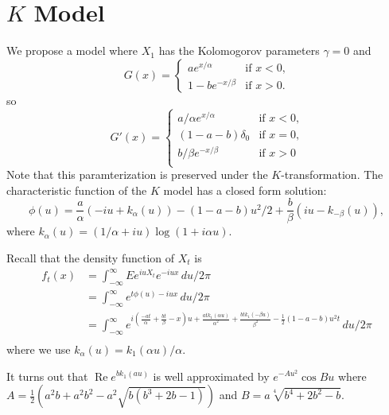 \documentclass[fleqn]{amsart}
\renewcommand{\Re}{\mathop{\mathrm{Re}}}
\begin{document}
\section{\(K\) Model}
We propose a model where \(X_1\) has the Kolomogorov parameters
\(\gamma = 0\) and 
\begin{equation*}
G(x) =
\begin{cases}
ae^{x/\alpha} & \text{if $x < 0$,}\\
1 - be^{-x/\beta} & \text{if $x > 0$.}
\end{cases}
\end{equation*}
so
\begin{equation*}
G'(x) =
\begin{cases}
a/\alpha e^{x/\alpha} & \text{if $x < 0$,}\\
(1 - a - b)\delta_0 & \text{if $x = 0$,}\\
b/\beta e^{-x/\beta} & \text{if $x > 0$}\\
\end{cases}
\end{equation*}
Note that this paramterization is preserved under the
\(K\)-transformation.
The characteristic function
of the \(K\) model has a closed form solution:
\[
\phi(u) =
\frac{a}{\alpha}(-iu + k_\alpha(u))
-(1 - a - b)u^2/2
+\frac{b}{\beta}(iu - k_{-\beta}(u)),
\]
where \(k_\alpha(u) = (1/\alpha + iu)\log (1 + i\alpha u)\).


Recall that the density function of \(X_t\) is
\begin{align*}
f_t(x) &= \int_{-\infty}^\infty E e^{iuX_t} e^{-iux}\,du/2\pi \\
	&= \int_{-\infty}^\infty e^{t\phi(u) - iux}\,du/2\pi \\
	&= \int_{-\infty}^\infty e^{
		i(\frac{-at}{\alpha} + \frac{bt}{\beta} - x)u
		+ \frac{atk_1(\alpha u)}{\alpha^2}
		+ \frac{btk_1(-\beta u)}{\beta^2}
		- \frac{1}{2}(1 - a - b)u^2t
		}\,du/2\pi \\
\end{align*}
where we use \(k_\alpha(u) = k_1(\alpha u)/\alpha\).

It turns out that \(\Re e^{b k_1(a u)}\) is well approximated by
\(e^{-Au^2}\cos Bu\) where
\(A = \frac{1}{2}(a^2b + a^2b^2 - a^2\sqrt{b(b^3 + 2b - 1)})\) and
\(B = a\sqrt[4]{b^4 + 2b^2 - b}\).
\end{document}
